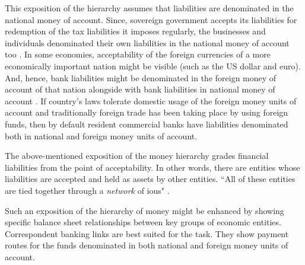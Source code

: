 This exposition of the hierarchy assumes that liabilities are
denominated in the national money of account. Since, sovereign
government accepts its liabilities for redemption of the tax liabilities
it imposes regularly, the businesses and individuals denominated their
own liabilities in the national money of account too \citep{bell}. In
some economies, acceptability of the foreign currencies of a more
economically important nation might be visible (such as the US dollar
and euro). And, hence, bank liabilities might be denominated in the
foreign money of account of that nation alongside with bank
liabilities in national money of account \citep[p.~148]{wray2020}. If
country's laws tolerate domestic usage of the foreign money units of
account and traditionally foreign trade has been taking place by using
foreign funds, then by default resident commercial banks have
liabilities denominated both in national and foreign money units of
account.

The above-mentioned exposition of the money hierarchy grades financial
liabilities from the point of acceptability. In other words, there are
entities whose liabilities are accepted and held as assets by other
entities. ``All of these entities are tied together through a \textit{network}
of \acp{iou}" \citep[p.~10, emphasis added]{wray2022_2}.

Such an exposition of the hierarchy of money might be enhanced by
showing specific balance sheet relationships between key groups of
economic entities. Correspondent banking links are best suited for the
task. They show payment routes for the funds denominated in both
national and foreign money units of account.

